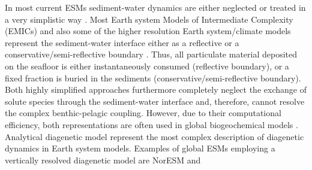 \documentclass[gmd, manuscript]{copernicus}
\begin{document}
In most current ESMs sediment-water dynamics are either neglected or treated in a very simplistic way \citep{soetaert_coupling_2000, hulse_understanding_2017}. 
Most Earth system Models of Intermediate Complexity (EMICs) and also some of the higher resolution Earth system/climate models represent the sediment-water interface either as a 
reflective or a conservative/semi-reflective boundary \citep{hulse_understanding_2017}. 
Thus, all particulate material deposited on the seafloor is either instantaneously consumed (reflective boundary), or a fixed fraction is buried in the sediments (conservative/semi-reflective boundary). 
Both highly simplified approaches furthermore completely neglect the exchange of solute species through the sediment-water interface and, therefore, cannot resolve the complex benthic-pelagic coupling. 
However, due to their computational efficiency, both representations are often used in global biogeochemical models \citep[e.g.][]{najjar_impact_2007, ridgwell_marine_2007, goosse_description_2010}. 
Analytical diagenetic model represent the most complex description of diagenetic dynamics in Earth system models. Examples of global ESMs employing a vertically resolved diagenetic model are NorESM \citep{tjiputra_evaluation_2013} and 
\end{document}
